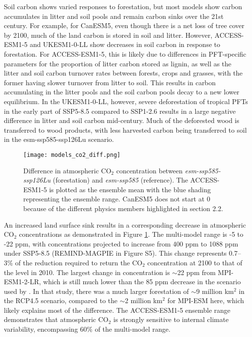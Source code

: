 \documentclass[draft]{agujournal2019}
\begin{document}
Soil carbon shows varied responses to forestation, but most models show carbon accumulates in litter and soil pools and remain carbon sinks over the 21st century.
For example, for CanESM5, even though there is a net loss of tree cover by 2100, much of the land carbon is stored in soil and litter.
However, ACCESS-ESM1-5 and UKESM1-0-LL show decreases in soil carbon in response to forestation.
For ACCESS-ESM1-5, this is likely due to differences in PFT-specific parameters for the proportion of litter carbon stored as lignin, as well as the litter and soil carbon turnover rates between forests, crops and grasses, with the former having slower turnover from litter to soil.
This results in carbon accumulating in the litter pools and the soil carbon pools decay to a new lower equilibrium.
In the UKESM1-0-LL, however, severe deforestation of tropical PFTs in the early part of SSP5-8.5 compared to SSP1-2.6 results in a large negative difference in litter and soil carbon mid-century.
Much of the deforested wood is transferred to wood products, with less harvested carbon being transferred to soil in the esm-ssp585-ssp126Lu scenario.

\begin{figure}
    \texttt{[image: models\_co2\_diff.png]}
    \caption{Difference in atmospheric CO$_2$ concentration between \textit{esm-ssp585-ssp126Lu} (forestation) and \textit{esm-ssp585} (reference). The ACCESS-ESM1-5 is plotted as the ensemble mean with the blue shading representing the ensemble range. CanESM5 does not start at 0 because of the different physics members highlighted in section 2.2.}
    \label{fig:models_CO2}
\end{figure}

An increased land surface sink results in a corresponding decrease in atmospheric CO$_2$ concentrations as demonstrated in Figure \ref{fig:models_CO2}.
The multi-model range is -5 to -22 ppm, with concentrations projected to increase from 400 ppm to 1088 ppm under SSP5-8.5 (REMIND-MAGPIE in Figure S5).
This change represents 0.7–3\% of the reduction required to return the CO$_2$ concentration at 2100 to that of the level in 2010.
The largest change in concentration is $\sim$22 ppm from MPI-ESM1-2-LR, which is still much lower than the 85 ppm decrease in the scenario used by .
In that study, there was a much larger forestation of $\sim$9 million km$^2$ in the RCP4.5 scenario, compared to the $\sim$2 million km$^2$ for MPI-ESM here, which likely explains most of the difference.
The ACCESS-ESM1-5 ensemble range demonstrates that atmospheric CO$_2$ is strongly sensitive to internal climate variability, encompassing 60\% of the multi-model range.
\end{document}
